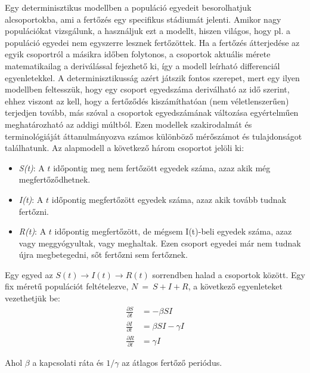     Egy determinisztikus modellben a populáció egyedeit besorolhatjuk alcsoportokba, ami a fertőzés egy specifikus stádiumát jelenti. Amikor nagy populációkat vizsgálunk, a használjuk ezt a modellt, hiszen világos, hogy pl. a populáció egyedei nem egyszerre lesznek fertőzöttek. Ha a fertőzés átterjedése az egyik csoportról a másikra időben folytonos, a csoportok aktuális mérete matematikailag a deriválással fejezhető ki, így a modell leírható differenciál egyenletekkel. A determinisztikusság azért játszik fontos szerepet, mert egy ilyen modellben feltesszük, hogy egy csoport egyedszáma deriválható az idő szerint, ehhez viszont az kell, hogy a fertőződés kiszámíthatóan (nem véletlenszerűen) terjedjen tovább, más szóval a csoportok egyedszámának változása egyértelműen meghatározható az addigi múltból. Ezen modellek szakirodalmát és terminológiáját áttanulmányozva számos különböző mérőszámot és tulajdonságot találhatunk. Az alapmodell a következő három csoportot jelöli ki:
    \begin{itemize}
      \item \emph{S(t)}: A $t$ időpontig meg nem fertőzött egyedek száma, azaz akik még megfertőződhetnek.
      \item \emph{I(t)}: A $t$ időpontig megfertőzött egyedek száma, azaz akik tovább tudnak fertőzni.
      \item \emph{R(t)}: A $t$ időpontig megfertőzött, de mégsem I(t)-beli egyedek száma, azaz vagy meggyógyultak, vagy meghaltak. Ezen csoport egyedei már nem tudnak újra megbetegedni, sőt fertőzni sem fertőznek.
    \end{itemize}

    Egy egyed az $S(t) \rightarrow I(t) \rightarrow R(t)$ sorrendben halad a csoportok között. Egy fix méretű populációt feltételezve, $N~=~S+I+R$, a következő egyenleteket vezethetjük be\cite{Contributions_to_the_mathematical_theory_of_epidemics}:
    \begin{align}
      \frac{\partial S}{\partial t} &= - \beta S I\\
      \frac{\partial I}{\partial t} &= \beta S I - \gamma I\\
      \frac{\partial R}{\partial t} &= \gamma I
    \end{align}

    Ahol $\beta$ a kapcsolati ráta és $1/\gamma$ az átlagos fertőző periódus.\\

